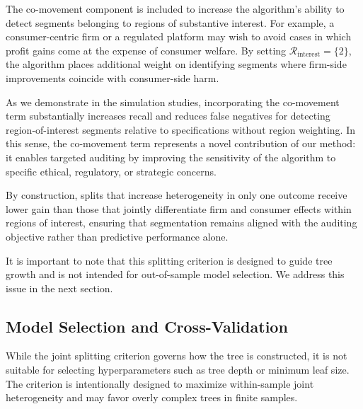 \documentclass[11pt,letterpaper,english]{article}
\theoremstyle{definition}
\theoremstyle{definition}
\begin{document}
\begin{bibunit}
The co-movement component is included to increase the algorithm’s ability to detect segments belonging to regions of substantive interest. For example, a consumer-centric firm or a regulated platform may wish to avoid cases in which profit gains come at the expense of consumer welfare. By setting $\mathcal{R}_{\text{interest}} = \{2\}$, the algorithm places additional weight on identifying segments where firm-side improvements coincide with consumer-side harm.

As we demonstrate in the simulation studies, incorporating the co-movement term substantially increases recall and reduces false negatives for detecting region-of-interest segments relative to specifications without region weighting. In this sense, the co-movement term represents a novel contribution of our method: it enables targeted auditing by improving the sensitivity of the algorithm to specific ethical, regulatory, or strategic concerns.

By construction, splits that increase heterogeneity in only one outcome receive lower gain than those that jointly differentiate firm and consumer effects within regions of interest, ensuring that segmentation remains aligned with the auditing objective rather than predictive performance alone.

\vspace{6pt}

\noindent
It is important to note that this splitting criterion is designed to guide tree growth and is not intended for out-of-sample model selection. We address this issue in the next section.

\subsection{Model Selection and Cross-Validation}
\label{sec:model-selection}

While the joint splitting criterion governs how the tree is constructed, it is not suitable for selecting hyperparameters such as tree depth or minimum leaf size. The criterion is intentionally designed to maximize within-sample joint heterogeneity and may favor overly complex trees in finite samples.


\end{bibunit}
\end{document}
